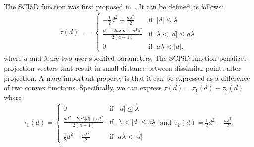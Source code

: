 The \mbox{SCISD} function was first proposed in~\cite{quadrianto2011icml}.  It can be defined as follows:
\begin{align}
\tau(d) & =\left\{ \begin{array}{ll}
         -\frac{1}{2}d^{2}+\frac{a\lambda^2}{2} & \mbox{if ~} |d| \le \lambda \\
         \frac{d^{2}-2a\lambda|d|+a^2\lambda^2}{2(a-1)}& \mbox{if ~}\lambda < |d|\le a\lambda\\
         0 & \mbox{if ~} a\lambda<|d|,\nonumber
                          \end{array} \right.
\end{align}
where $a$ and $\lambda$ are two user-specified parameters.  The \mbox{SCISD} function penalizes projection vectors that result in small distance between dissimilar points after projection.  A more important property is that it can be expressed as a difference of two convex functions.  Specifically, we can express $\tau(d) = \tau_{1}(d) - \tau_{2}(d)$ where
\begin{align}
\tau_{1}(d) = \left\{ \begin{array}{ll}
         0 & \mbox{if ~}|d| \le \lambda \\
         \frac{ad^{2}-2a\lambda|d|+a\lambda^2}{2(a-1)}& \mbox{if ~}\lambda < |d|\le a\lambda\\
         \frac{1}{2}d^{2}-\frac{a\lambda^2}{2} & \mbox{if ~} a\lambda<|d|\nonumber
                          \end{array} \right.\ \mbox{and}  \ \ 
\tau_{2}(d) = \frac{1}{2}d^{2}-\frac{a\lambda^2}{2}.\nonumber
\end{align}

